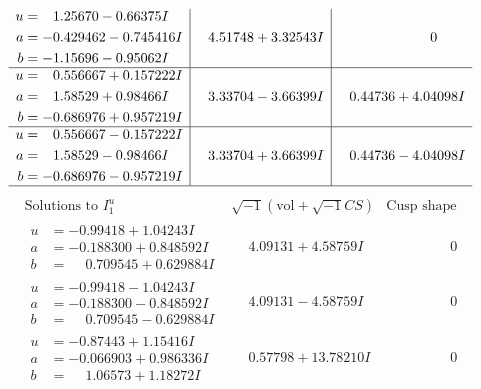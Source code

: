 \documentclass[1p]{elsarticle_modified}
\theoremstyle{definition}
\newcommand{\I}{\sqrt{-1}}
\begin{document}
$$\begin{array}{c|c|c}
\begin{aligned}
u &= \phantom{-}1.25670 - 0.66375 I \\
a &= -0.429462 - 0.745416 I \\
b &= -1.15696 - 0.95062 I\end{aligned}
 & \phantom{-}4.51748 + 3.32543 I & \phantom{-0.000000 } 0 \\ \hline\begin{aligned}
u &= \phantom{-}0.556667 + 0.157222 I \\
a &= \phantom{-}1.58529 + 0.98466 I \\
b &= -0.686976 + 0.957219 I\end{aligned}
 & \phantom{-}3.33704 - 3.66399 I & \phantom{-}0.44736 + 4.04098 I \\ \hline\begin{aligned}
u &= \phantom{-}0.556667 - 0.157222 I \\
a &= \phantom{-}1.58529 - 0.98466 I \\
b &= -0.686976 - 0.957219 I\end{aligned}
 & \phantom{-}3.33704 + 3.66399 I & \phantom{-}0.44736 - 4.04098 I\\
 \hline 
 \end{array}$$\newpage$$\begin{array}{c|c|c}  
\text{Solutions to }I^u_{1}& \I (\text{vol} + \sqrt{-1}CS) & \text{Cusp shape}\\
 \hline 
\begin{aligned}
u &= -0.99418 + 1.04243 I \\
a &= -0.188300 + 0.848592 I \\
b &= \phantom{-}0.709545 + 0.629884 I\end{aligned}
 & \phantom{-}4.09131 + 4.58759 I & \phantom{-0.000000 } 0 \\ \hline\begin{aligned}
u &= -0.99418 - 1.04243 I \\
a &= -0.188300 - 0.848592 I \\
b &= \phantom{-}0.709545 - 0.629884 I\end{aligned}
 & \phantom{-}4.09131 - 4.58759 I & \phantom{-0.000000 } 0 \\ \hline\begin{aligned}
u &= -0.87443 + 1.15416 I \\
a &= -0.066903 + 0.986336 I \\
b &= \phantom{-}1.06573 + 1.18272 I\end{aligned}
 & \phantom{-}0.57798 + 13.78210 I & \phantom{-0.000000 } 0 \\ \hline\begin{aligned}

\end{aligned}
\end{array}$$
\end{document}
